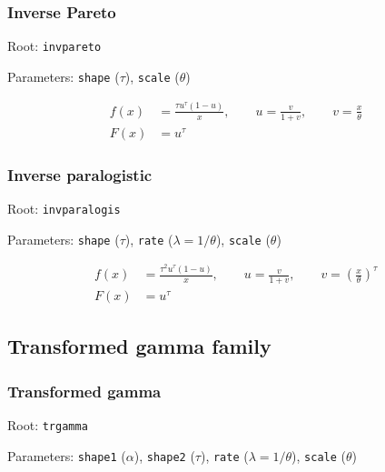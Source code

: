 \documentclass[x11names]{article}
\newcommand{\code}[1]{\texttt{#1}}
\begin{document}
\subsubsection*{Inverse Pareto}

\begin{compactitem}[]
\item Root: \code{invpareto}
\item Parameters: \code{shape} ($\tau$),
      \code{scale}  ($\theta$)
\end{compactitem}

\begin{align*}
  f(x) &= \frac{\tau u^\tau (1 - u)}{x},
  \qquad u = \frac{v}{1 + v},
  \qquad v = \frac{x}{\theta} \\
  F(x) &= u^\tau
\end{align*}

\subsubsection*{Inverse paralogistic}

\begin{compactitem}[]
\item Root: \code{invparalogis}
\item Parameters: \code{shape} ($\tau$),
      \code{rate}   ($\lambda = 1/\theta$),
      \code{scale}  ($\theta$)
\end{compactitem}

\begin{align*}
  f(x) &= \frac{\tau^2 u^\tau (1 - u)}{x},
  \qquad u = \frac{v}{1 + v},
  \qquad v = \left(\frac{x}{\theta} \right)^\tau \\
  F(x) &= u^\tau
\end{align*}

\subsection{Transformed gamma family}
\label{sec:appendix:transformed-gamma}

\subsubsection*{Transformed gamma}

\begin{compactitem}[]
\item Root: \code{trgamma}
\item Parameters: \code{shape1} ($\alpha$),
      \code{shape2} ($\tau$),
      \code{rate}   ($\lambda = 1/\theta$),
      \code{scale}  ($\theta$)
\end{compactitem}
\end{document}
